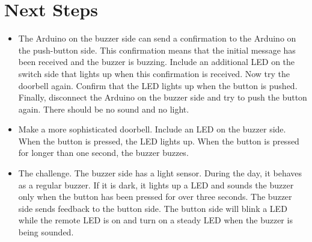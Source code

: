 \section{Next Steps}
\begin{itemize}
\item The Arduino on the buzzer side can send a confirmation to the Arduino on the push-button side.
This confirmation means that the initial message has been received and the buzzer is buzzing.
Include an additional LED on the switch side that lights up when this confirmation is received.
Now try the doorbell again.
Confirm that the LED lights up when the button is pushed.
Finally, disconnect the Arduino on the buzzer side and try to push the button again.
There should be no sound and no light.
\item Make a more sophisticated doorbell.
Include an LED on the buzzer side.
When the button is pressed, the LED lights up.
When the button is pressed for longer than one second, the buzzer buzzes.
\item The challenge. The buzzer side has a light sensor. During the day, it behaves as a regular buzzer.
If it is dark, it lights up a LED and sounds the buzzer only when the button has been pressed for over three seconds.
The buzzer side sends feedback to the button side.
The button side will blink a LED while the remote LED is on and turn on a steady LED when the buzzer is being sounded.

\end{itemize}





